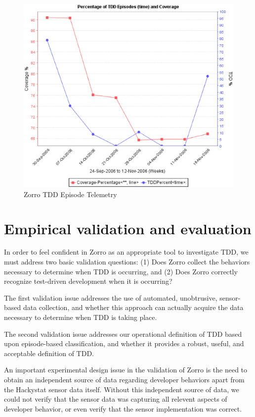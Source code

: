 \documentclass[smallextended]{svjour3}     %
\begin{document}
\begin{figure}[th]
  \center
  \includegraphics[width=1.0\textwidth]{zorro-tdd-coverage-2.eps}
  \caption{Zorro TDD Episode Telemetry}
  \label{fig:Analysis-Telemetry}
\end{figure} 


\section{Empirical validation and evaluation}
\label{sec:validation}

In order to feel confident in Zorro as an appropriate tool to investigate
TDD, we must address two basic validation questions: (1) Does Zorro collect
the behaviors necessary to determine when TDD is occurring, and (2) Does
Zorro correctly recognize test-driven development when it is occurring?

The first validation issue addresses the use of automated, unobtrusive,
sensor-based data collection, and whether this approach can actually
acquire the data necessary to determine when TDD is taking place.

The second validation issue addresses our operational definition of TDD
based upon episode-based classification, and whether it provides a robust,
useful, and acceptable definition of TDD.

An important experimental design issue in the validation of Zorro is the
need to obtain an independent source of data regarding developer behaviors
apart from the Hackystat sensor data itself.  Without this independent
source of data, we could not verify that the sensor data was capturing
all relevent aspects of developer behavior, or even verify that the sensor
implementation was correct.
\end{document}
